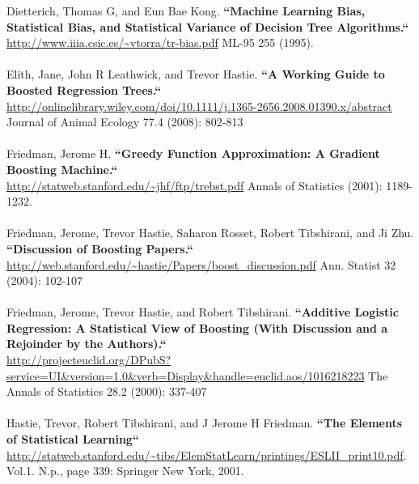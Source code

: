 Dietterich, Thomas G, and Eun Bae Kong. {\textbf{``Machine Learning Bias, Statistical Bias, and Statistical Variance of Decision Tree Algorithms.``}} \\
\url{http://www.iiia.csic.es/~vtorra/tr-bias.pdf} ML-95 255 (1995).
\\
\\
Elith, Jane, John R Leathwick, and Trevor Hastie. {\textbf{``A Working Guide to Boosted Regression Trees.``}} \\\url{http://onlinelibrary.wiley.com/doi/10.1111/j.1365-2656.2008.01390.x/abstract} Journal of Animal Ecology 77.4 (2008): 802-813
\\
\\
Friedman, Jerome H. {\textbf{``Greedy Function Approximation: A Gradient Boosting Machine.``}}\\
 \url{http://statweb.stanford.edu/~jhf/ftp/trebst.pdf} Annals of Statistics (2001): 1189-1232.
\\
\\
Friedman, Jerome, Trevor Hastie, Saharon Rosset, Robert Tibshirani, and Ji Zhu. {\textbf{``Discussion of Boosting Papers.``}}\\
\url{http://web.stanford.edu/~hastie/Papers/boost_discussion.pdf} Ann. Statist 32 (2004): 102-107
\\
\\
Friedman, Jerome, Trevor Hastie, and Robert Tibshirani. {\textbf{``Additive Logistic Regression: A Statistical View of Boosting (With Discussion and a Rejoinder by the Authors).``}}\\
 \url{http://projecteuclid.org/DPubS?service=UI&version=1.0&verb=Display&handle=euclid.aos/1016218223} The Annals of Statistics 28.2 (2000): 337-407
\\
\\
Hastie, Trevor, Robert Tibshirani, and J Jerome H Friedman. {\textbf{``The Elements of Statistical Learning``}}\\
  \url{http://statweb.stanford.edu/~tibs/ElemStatLearn/printings/ESLII_print10.pdf}. Vol.1. N.p., page 339: Springer New York, 2001.


